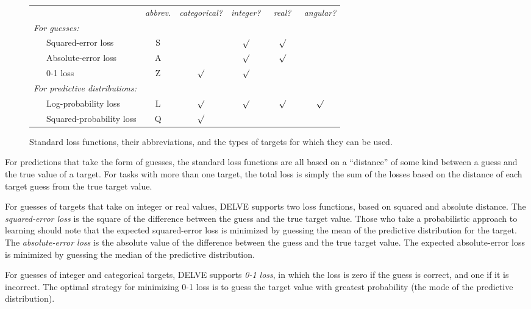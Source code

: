 \begin{figure}[t]

\begin{center}\begin{tabular}{lccccc}
& {\em abbrev.} 
& {\em categorical?} & {\em integer?} & {\em ~real?~} & {\em angular?} \\[-4pt]
{\em For guesses:} \\
~~~Squared-error loss      & S &         & $\surd$ & $\surd$ &         \\
~~~Absolute-error loss     & A &         & $\surd$ & $\surd$ &         \\
~~~0-1 loss                & Z & $\surd$ & $\surd$ &         &         \\[6pt]
{\em For predictive distributions:} \\
~~~Log-probability loss    & L & $\surd$ & $\surd$ & $\surd$ & $\surd$ \\
~~~Squared-probability loss& Q & $\surd$ &         &         &         \\
\end{tabular}\end{center}

\caption{Standard loss functions, their abbreviations, and the
types of targets for which they can be used.}
\label{fig-losses}
\end{figure}

For predictions that take the form of guesses, the standard loss
functions are all based on a ``distance'' of some kind between a guess
and the true value of a target.  For tasks with more than one target,
the total loss is simply the sum of the losses based on the distance
of each target guess from the true target value.

For guesses of targets that take on integer or real values, DELVE
supports two loss functions, based on squared and absolute distance.
The {\em squared-error loss\/} is the square of the difference between
the guess and the true target value.  Those who take a probabilistic
approach to learning should note that the expected squared-error loss
is minimized by guessing the mean of the predictive distribution for
the target.  The {\em absolute-error loss\/} is the absolute value of
the difference between the guess and the true target value.  The
expected absolute-error loss is minimized by guessing the median of
the predictive distribution.

For guesses of integer and categorical targets, DELVE supports {\em
0-1 loss\/}, in which the loss is zero if the guess is correct, and
one if it is incorrect.  The optimal strategy for minimizing 0-1 loss
is to guess the target value with greatest probability (the mode of
the predictive distribution).

